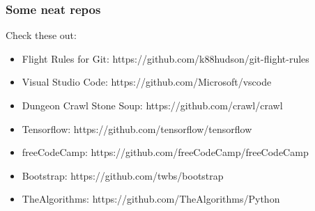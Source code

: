\documentclass[unknownkeysallowed]{beamer}
\begin{document}
\begin{frame}
    \frametitle{Some neat repos}
    \vspace{0.75cm}
    Check these out:
    \vspace{0.25cm}
    \begin{itemize}
        \item{Flight Rules for Git: https://github.com/k88hudson/git-flight-rules}
        \item{Visual Studio Code: https://github.com/Microsoft/vscode}
        \item{Dungeon Crawl Stone Soup: https://github.com/crawl/crawl}
        \item{Tensorflow: https://github.com/tensorflow/tensorflow}
        \item{freeCodeCamp: https://github.com/freeCodeCamp/freeCodeCamp}
        \item{Bootstrap: https://github.com/twbs/bootstrap}
        \item{TheAlgorithms: https://github.com/TheAlgorithms/Python}
    \end{itemize}
\end{frame}
\end{document}
